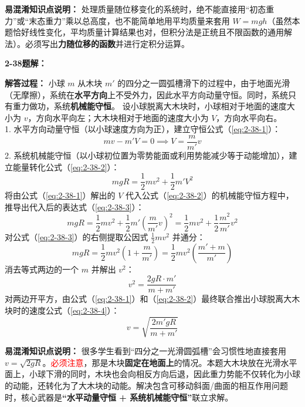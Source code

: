 \textbf{易混淆知识点说明：}
处理质量随位移变化的系统时，绝不能直接用“初态重力”或“末态重力”乘以总高度，也不能简单地用平均质量来套用 $W = mgh$（虽然本题恰好线性变化，平均质量计算结果也对，但积分法是正统且不限函数的通用解法）。必须写出\textbf{力随位移的函数}并进行定积分运算。

\vspace{2em}

\textbf{2-38题解：}
\setcounter{equation}{0}
\renewcommand{\theHequation}{2-38.\arabic{equation}}

\textbf{解答过程：}
小球 $m$ 从木块 $m'$ 的四分之一圆弧槽滑下的过程中，由于地面光滑（无摩擦），系统在\textbf{水平方向}上不受外力，因此水平方向动量守恒。同时，系统只有重力做功，系统\textbf{机械能守恒}。
设小球脱离大木块时，小球相对于地面的速度大小为 $v$，方向水平向左；大木块相对于地面的速度大小为 $V$，方向水平向右。\\
1. 水平方向动量守恒（以小球速度方向为正），建立守恒公式（\ref{eq:2-38-1}）：
\begin{equation}\label{eq:2-38-1}
	mv - m'V = 0 \implies V = \frac{m}{m'}v
\end{equation}
2. 系统机械能守恒（以小球初位置为零势能面或利用势能减少等于动能增加），建立能量转化公式（\ref{eq:2-38-2}）：
\begin{equation}\label{eq:2-38-2}
	mgR = \frac{1}{2}mv^2 + \frac{1}{2}m'V^2
\end{equation}
将由公式（\ref{eq:2-38-1}）解出的 $V$ 代入公式（\ref{eq:2-38-2}）的机械能守恒方程中，推导出代入后的表达式（\ref{eq:2-38-3}）：
\begin{equation}\label{eq:2-38-3}
	mgR = \frac{1}{2}mv^2 + \frac{1}{2}m'\left(\frac{m}{m'}v\right)^2 = \frac{1}{2}mv^2 + \frac{1}{2}\frac{m^2}{m'}v^2
\end{equation}
对公式（\ref{eq:2-38-3}）的右侧提取公因式 $\frac{1}{2}mv^2$ 并通分：
$$mgR = \frac{1}{2}mv^2 \left(1 + \frac{m}{m'}\right) = \frac{1}{2}mv^2 \left(\frac{m' + m}{m'}\right)$$
消去等式两边的一个 $m$ 并解出 $v^2$：
$$v^2 = \frac{2gR \cdot m'}{m + m'}$$
对两边开平方，由公式（\ref{eq:2-38-1}）和（\ref{eq:2-38-2}）最终联合推出小球脱离大木块时的速度公式（\ref{eq:2-38-4}）：
\begin{equation}\label{eq:2-38-4}
	v = \sqrt{\frac{2m'gR}{m + m'}}
\end{equation}

\textbf{易混淆知识点说明：}
很多学生看到“四分之一光滑圆弧槽”会习惯性地直接套用 $v = \sqrt{2gR}$。\textcolor{red}{必须注意}，那是木块\textbf{固定在地面上}的情况。本题大木块放在光滑水平面上，小球下滑的同时，木块也会向相反方向后退，因此重力势能不仅转化为小球的动能，还转化为了大木块的动能。解决包含可移动斜面/曲面的相互作用问题时，核心武器是\textbf{“水平动量守恒 + 系统机械能守恒”}联立求解。
\newpage


